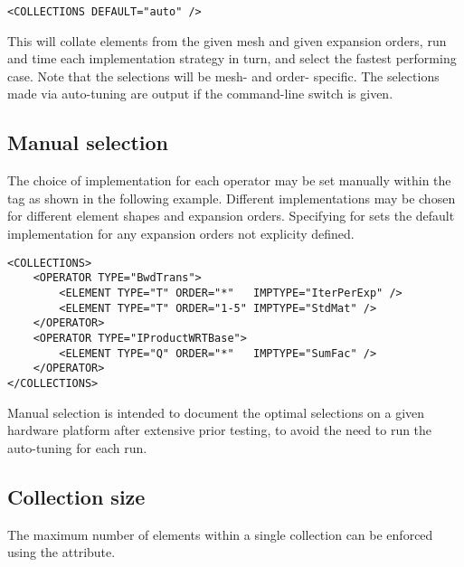 \begin{lstlisting}[style=XmlStyle]
<COLLECTIONS DEFAULT="auto" />
\end{lstlisting}

This will collate elements from the given mesh and given expansion orders,
run and time each implementation strategy in turn, and select the fastest
performing case. Note that the selections will be mesh- and order- specific.
The selections made via auto-tuning are output if the 
command-line switch is given.

\subsection{Manual selection}
The choice of implementation for each operator may be set manually within the
 tag as shown in the following example. Different implementations may be chosen for different element shapes and expansion orders.
Specifying \inltt{*} for  sets the default implementation for any
expansion orders not explicity defined.
\begin{lstlisting}[style=XmlStyle]
<COLLECTIONS>
    <OPERATOR TYPE="BwdTrans">
        <ELEMENT TYPE="T" ORDER="*"   IMPTYPE="IterPerExp" />
        <ELEMENT TYPE="T" ORDER="1-5" IMPTYPE="StdMat" />
    </OPERATOR>
    <OPERATOR TYPE="IProductWRTBase">
        <ELEMENT TYPE="Q" ORDER="*"   IMPTYPE="SumFac" />
    </OPERATOR>
</COLLECTIONS>
\end{lstlisting}

Manual selection is intended to document the optimal selections on a given
hardware platform after extensive prior testing, to avoid the need to run the
auto-tuning for each run.

\subsection{Collection size}
The maximum number of elements within a single collection can be enforced using
the  attribute.

